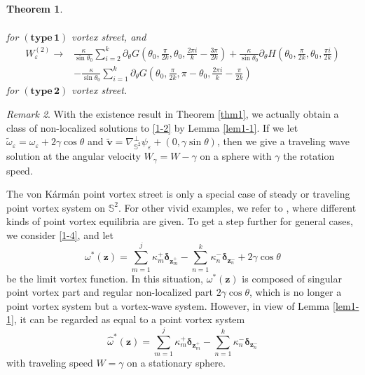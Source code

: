 \documentclass[12pt,reqno]{amsart}
\numberwithin{equation}{section}
\newtheorem{theorem}{Theorem}[section]
\theoremstyle{definition}
\theoremstyle{remark}
\newtheorem{remark}[theorem]{Remark}
\newcommand{\ep}{\varepsilon}
\begin{document}
\begin{theorem}
\begin{itemize}
\begin{align*}
   		\end{align*}
   		for $(\mathbf{type\, 1})$ vortex street, and
   		\begin{align*}
   			W_\varepsilon^{(2)}\to&\frac{\kappa}{\sin\theta_0}\sum\limits_{i=2}^k\partial_\theta G\left(\theta_0,\frac{\pi}{2k},\theta_0,\frac{2\pi i}{k}-\frac{3\pi}{2k}\right)+\frac{\kappa}{\sin\theta_0}\partial_\theta H\left(\theta_0,\frac{\pi}{2k},\theta_0,\frac{\pi i}{2k}\right)\\
   			&-\frac{\kappa}{\sin\theta_0}\sum\limits_{i=1}^k\partial_\theta G\left(\theta_0,\frac{\pi}{2k},\pi-\theta_0,\frac{2\pi i}{k}-\frac{\pi}{2k}\right)
   		\end{align*}
   	    for $(\mathbf{type\, 2})$ vortex street.
   	\end{itemize}
   \end{theorem}
   
   \begin{remark}
   	With the existence result in Theorem \ref{thm1}, we actually obtain a class of non-localized solutions to \eqref{1-2} by Lemma \ref{lem1-1}. If we let $\tilde\omega_\ep=\omega_\varepsilon+2\gamma\cos\theta$ and $\tilde{\boldsymbol v}=\nabla^\perp_{\mathbb S^2}\psi_\varepsilon+(0,\gamma\sin\theta)$, then we give a traveling wave solution at the angular velocity $W_\gamma=W-\gamma$ on a sphere with $\gamma$ the rotation speed.
   \end{remark}
   
   The von K\'arm\'an point vortex street is only a special case of steady or traveling point vortex system on $\mathbb S^2$. For other vivid examples, 
   we refer to \cite{New}, where different kinds of point vortex equilibria are given. To get a step further for general cases, we consider \eqref{1-4}, and let 
   \begin{equation*}
   	  \omega^*(\boldsymbol z)=\sum\limits_{m=1}^{j}\kappa_m^+\boldsymbol \delta_{\boldsymbol z_m^+}-\sum\limits_{n=1}^{k}\kappa_n^-\boldsymbol \delta_{\boldsymbol z_n^-}+2\gamma\cos\theta
   \end{equation*}
   be the limit vortex function. In this situation, $\omega^*(\boldsymbol z)$ is composed of singular point vortex part and regular non-localized part $2\gamma\cos\theta$, which is no longer a point vortex system but a vortex-wave system. However, in view of Lemma \ref{lem1-1}, it can be regarded as equal to a point vortex system
   \begin{equation*}
   	\hat\omega^*(\boldsymbol z)=\sum\limits_{m=1}^{j}\kappa_m^+\boldsymbol \delta_{\boldsymbol z_m^+}-\sum\limits_{n=1}^{k}\kappa_n^-\boldsymbol \delta_{\boldsymbol z_n^-}
   \end{equation*}
   with traveling speed $W=\gamma$ on a stationary sphere. 
   
\end{document}
